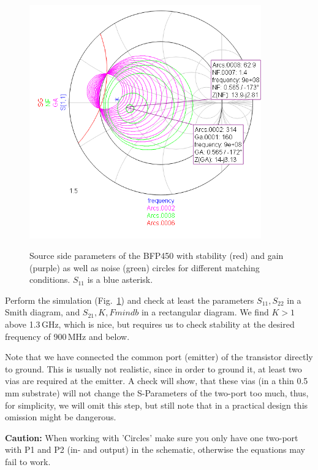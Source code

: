 \begin{figure}
  \centering
  {\includegraphics[width=10cm]{bfp450_1_source.png}}
  \caption{Source side parameters of the BFP450 with stability (red) and
    gain (purple) as well as noise (green) circles for different
    matching conditions. $S_{11}$ is a blue asterisk.}
  \label{fig:bfp450_1_source}
\end{figure}

Perform the simulation (Fig.~\ref{fig:bfp450_1_source}) and check at
least the parameters $S_{11},S_{22}$ in a Smith diagram, and $S_{21},
K, Fmindb$ in a rectangular diagram. We find $K>1$ above 1.3\,GHz,
which is nice, but requires us to check stability at the desired
frequency of 900\,MHz and below.

Note that we have connected the common port (emitter) of the
transistor directly to ground. This is usually not realistic, since in
order to ground it, at least two vias are required at the emitter. A
check will show, that these vias (in a thin 0.5\,mm substrate) will
not change the S-Parameters of the two-port too much, thus, for
simplicity, we will omit this step, but still note that in a practical
design this omission might be dangerous.


{\bf Caution:} When working with 'Circles' make sure you only have
one two-port with P1 and P2 (in- and output) in the schematic,
otherwise the equations may fail to work.


